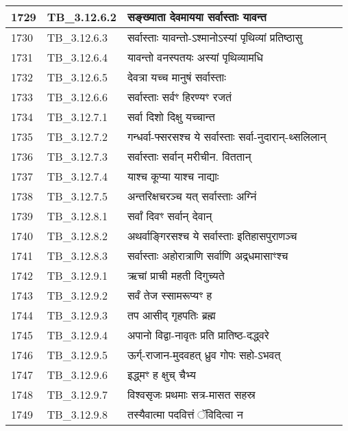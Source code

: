 \documentclass[17pt]{extarticle}
\begin{document}
\begin{longtable}{||p{0.4in}||p{0.9in}||p{4.0in}||p{0.9in}||}
        \hline
            1729 & TB\_3.12.6.2 & सङ्ख्याता देवमायया सर्वास्ताः यावन्त &      \\
        \hline
            1730 & TB\_3.12.6.3 & सर्वास्ताः यावन्तो{-}ऽश्मानोऽस्यां पृथिव्यां प्रतिष्ठासु &      \\
        \hline
            1731 & TB\_3.12.6.4 & यावन्तो वनस्पतयः अस्यां पृथिव्यामधि &      \\
        \hline
            1732 & TB\_3.12.6.5 & देवत्रा यच्च मानुषं सर्वास्ताः &      \\
        \hline
            1733 & TB\_3.12.6.6 & सर्वास्ताः सर्वꣳ हिरण्यꣳ रजतं &      \\
        \hline
            1734 & TB\_3.12.7.1 & सर्वा दिशो दिक्षु यच्चान्त &      \\
        \hline
            1735 & TB\_3.12.7.2 & गन्धर्वा{-}फ्सरसश्च ये सर्वास्ताः सर्वा{-}नुदारान्{-}थ्सलिलान् &      \\
        \hline
            1736 & TB\_3.12.7.3 & सर्वास्ताः सर्वान् मरीचीन. विततान् &      \\
        \hline
            1737 & TB\_3.12.7.4 & याश्च कूप्या याश्च नाद्याः &      \\
        \hline
            1738 & TB\_3.12.7.5 & अन्तरिक्षचरञ्च यत् सर्वास्ताः अग्निं &      \\
        \hline
            1739 & TB\_3.12.8.1 & सर्वां दिवꣳ सर्वान् देवान् &      \\
        \hline
            1740 & TB\_3.12.8.2 & अथर्वाङ्गिरसश्च ये सर्वास्ताः इतिहासपुराणञ्च &      \\
        \hline
            1741 & TB\_3.12.8.3 & सर्वास्ताः अहोरात्राणि सर्वाणि अद्र्धमासाꣳश्च &      \\
        \hline
            1742 & TB\_3.12.9.1 & ऋचां प्राची महती दिगुच्यते &      \\
        \hline
            1743 & TB\_3.12.9.2 & सर्वं तेज स्सामरूप्यꣳ ह &      \\
        \hline
            1744 & TB\_3.12.9.3 & तप आसीद् गृहपतिः ब्रह्म &      \\
        \hline
            1745 & TB\_3.12.9.4 & अपानो विद्वा{-}नावृतः प्रति प्रातिष्ठ{-}दद्ध्वरे &      \\
        \hline
            1746 & TB\_3.12.9.5 & ऊर्ग्{-}राजान{-}मुदवहत् ध्रुव गोपः सहो{-}ऽभवत् &      \\
        \hline
            1747 & TB\_3.12.9.6 & इद्ध्मꣳ ह क्षुच् चैभ्य &      \\
        \hline
            1748 & TB\_3.12.9.7 & विश्वसृजः प्रथमाः सत्र{-}मासत सहस्र &      \\
        \hline
            1749 & TB\_3.12.9.8 & तस्यैवात्मा पदवित्तं ॅविदित्वा न &      \\
        \hline
        \bottomrule
  \end{longtable}
  
\end{document}
